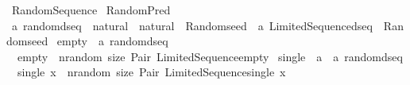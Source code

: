 %
\begin{isabellebody}%
%
%
\isadelimdocument
%
\endisadelimdocument
%
\isatagdocument
%
\isamarkuptrue%
%
\endisatagdocument
{\isafolddocument}%
%
\isadelimdocument
%
\endisadelimdocument
%
\isadelimtheory
%
\endisadelimtheory
%
\isatagtheory
{}\isamarkupfalse%
\ Random{\isacharunderscore}{\kern0pt}Sequence\isanewline
{}\ Random{\isacharunderscore}{\kern0pt}Pred\isanewline
{}%
\endisatagtheory
{\isafoldtheory}%
%
\isadelimtheory
\isanewline
%
\endisadelimtheory
\isanewline
{}\isamarkupfalse%
\ {\isacharprime}{\kern0pt}a\ random{\isacharunderscore}{\kern0pt}dseq\ {\isacharequal}{\kern0pt}\ {\isachardoublequoteopen}natural\ {\isasymRightarrow}\ natural\ {\isasymRightarrow}\ Random{\isachardot}{\kern0pt}seed\ {\isasymRightarrow}\ {\isacharparenleft}{\kern0pt}{\isacharprime}{\kern0pt}a\ Limited{\isacharunderscore}{\kern0pt}Sequence{\isachardot}{\kern0pt}dseq\ {\isasymtimes}\ Random{\isachardot}{\kern0pt}seed{\isacharparenright}{\kern0pt}{\isachardoublequoteclose}\isanewline
\isanewline
{}\isamarkupfalse%
\ empty\ {\isacharcolon}{\kern0pt}{\isacharcolon}{\kern0pt}\ {\isachardoublequoteopen}{\isacharprime}{\kern0pt}a\ random{\isacharunderscore}{\kern0pt}dseq{\isachardoublequoteclose}\isanewline
{}\isanewline
\ \ {\isachardoublequoteopen}empty\ {\isacharequal}{\kern0pt}\ {\isacharparenleft}{\kern0pt}{\isacharpercent}{\kern0pt}nrandom\ size{\isachardot}{\kern0pt}\ Pair\ {\isacharparenleft}{\kern0pt}Limited{\isacharunderscore}{\kern0pt}Sequence{\isachardot}{\kern0pt}empty{\isacharparenright}{\kern0pt}{\isacharparenright}{\kern0pt}{\isachardoublequoteclose}\isanewline
\isanewline
{}\isamarkupfalse%
\ single\ {\isacharcolon}{\kern0pt}{\isacharcolon}{\kern0pt}\ {\isachardoublequoteopen}{\isacharprime}{\kern0pt}a\ {\isacharequal}{\kern0pt}{\isachargreater}{\kern0pt}\ {\isacharprime}{\kern0pt}a\ random{\isacharunderscore}{\kern0pt}dseq{\isachardoublequoteclose}\isanewline
{}\isanewline
\ \ {\isachardoublequoteopen}single\ x\ {\isacharequal}{\kern0pt}\ {\isacharparenleft}{\kern0pt}{\isacharpercent}{\kern0pt}nrandom\ size{\isachardot}{\kern0pt}\ Pair\ {\isacharparenleft}{\kern0pt}Limited{\isacharunderscore}{\kern0pt}Sequence{\isachardot}{\kern0pt}single\ x{\isacharparenright}{\kern0pt}{\isacharparenright}{\kern0pt}{\isachardoublequoteclose}\isanewline

\end{isabellebody}
